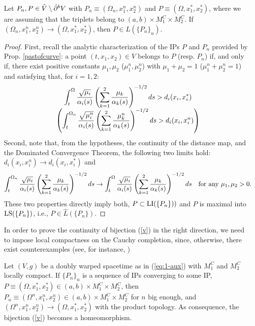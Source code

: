 \begin{prop}\label{prop:topbuenadir}
Let $P_n,P\in \hat{V}\setminus \hat{\partial}^{{\color{black} b}}V$ with $P_n\equiv (\Omega_n,x_1^n,x_2^n)$ and $P\equiv (\Omega,x_1^*,x_2^*)$, where we are assuming that the triplets belong to $(a,b)\times M_1^C\times M_2^C$. If $(\Omega_n,x_1^n,x_2^n)\rightarrow (\Omega,x_1^*,x_2^*)$, then $P\in \hat{L}(\{P_n\}_n)$.
\end{prop}
\begin{proof}
   First, recall the analytic characterization of the IPs $P$ and $P_n$ provided by Prop. \ref{pastofcurve}: a point $(t,x_1,x_2)\in V$ belongs to $ P$ (resp. $P_n$) if, and only if, there exist positive constants $\mu_1,\mu_2$ ($\mu_1^n,\mu_2^n$) with $\mu_1+\mu_2=1$ ($\mu_1^n+\mu_2^n=1$) and satisfying that, for $i=1,2$:
  \[
    \begin{array}{c}
      \displaystyle\int_{t}^{\Omega} \frac{\sqrt{\mu_{i}}}{\alpha_{i}(s)}\left(\sum_{k=1}^{2} \frac{\mu_{k}}{\alpha_{k}(s)} \right)^{-1/2}ds>d_i(x_i,x_i^*) \\
   \left( \displaystyle  \int_{t}^{\Omega_n} \frac{\sqrt{\mu^n_{i}}}{\alpha_{i}(s)}\left(\sum_{k=1}^{2} \frac{\mu^n_{k}}{\alpha_{k}(s)} \right)^{-1/2}ds>d_i(x_i,x_i^n)  \right)
    \end{array}
    \]
Second, note that, from the hypotheses, the continuity of the distance map, and the Dominated Convergence Theorem, the following two limits hold: $d_i(x_i,x_i^n)\rightarrow d_i(x_i,x_i^*)$ and
    \[
\int_{t}^{\Omega_n} \frac{\sqrt{\mu_{i}}}{\alpha_{i}(s)}\left(\sum_{k=1}^{2} \frac{\mu_{k}}{\alpha_{k}(s)} \right)^{-1/2}ds\rightarrow \int_{t}^{\Omega} \frac{\sqrt{\mu_{i}}}{\alpha_{i}(s)}\left(\sum_{k=1}^{2} \frac{\mu_{k}}{\alpha_{k}(s)} \right)^{-1/2}ds\quad\hbox{for any $\mu_1,\mu_2>0$.}
    \]
These two properties directly imply both, $P\subset {\rm LI}(\{P_n\}))$ and $P$ is maximal into ${\rm LS}(\{P_n\})$, i.e., $P\in \hat{L}(\{P_n\})$.
 \end{proof}

In order to prove the continuity of bijection (\ref{v}) in the right direction, we need to impose local compactness on the Cauchy completion, since, otherwise, there exist counterexamples (see, for instance, \cite[Example 4.9]{FHSBuseman})

\begin{prop}\label{topcurvasfinitas}
   Let $(V,g)$ be a doubly warped spacetime as in (\ref{eq:1-aux}) with $M_1^C$ and $ M_2^C$ locally compact. If $\{P_n\}_n$ is a sequence of IPs converging to some IP, $P\equiv (\Omega,x_1^*,x_2^*)\in (a,b) \times M_1^C\times M_2^C$, then $P_n\equiv (\Omega^n,x_1^n,x_2^n)\in (a,b) \times M_1^C\times M_2^C$ for $n$ big enough, and $(\Omega^n,x_1^n,x_2^n)\rightarrow (\Omega,x_1^*,x_2^*)$ with the product topology. As consequence, the bijection (\ref{v}) becomes a homeomorphism.
\end{prop}

